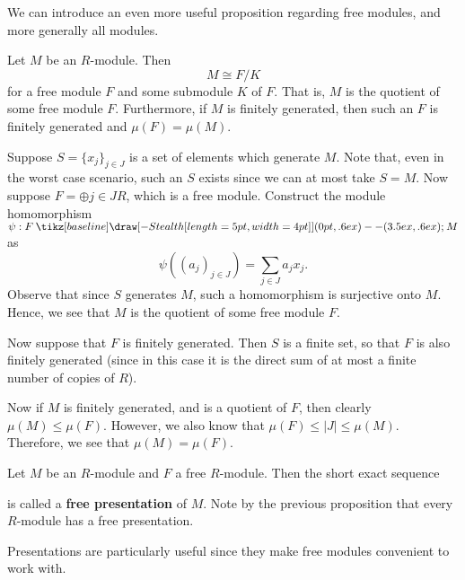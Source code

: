 \documentclass[12pt,letterpaper]{algebra_book}
\renewcommand{\to}{\mathbin{\tikz[baseline] \draw[-{Stealth[length=5pt,width=4pt]}] (0pt,.6ex) -- (3.5ex,.6ex);}}
\theoremstyle{definition}
\begin{document}
We can introduce an even more useful proposition regarding free
modules, and more generally all modules. 

\begin{proposition}
    Let $M$ be an $R$-module. Then 
    \[
        M \cong F/K    
    \]
    for a free module $F$ and some submodule $K$ of $F$. That is,
    $M$ is the quotient of some free module $F$. Furthermore, if
    $M$ is finitely generated, then such an $F$ is finitely
    generated and $\mu(F) = \mu(M)$. 
\end{proposition}

\begin{prf}
    Suppose $S = \{x_j\}_{j \in J}$ is a set of elements which
    generate $M$. Note that, even in the worst case scenario, such
    an $S$ exists since we can at most take $S = M$. Now suppose
    $F = \oplus{j \in J}R$, which is a free module. Construct the
    module homomorphism $\psi: F \to M$ as 
    \[
        \psi((a_j)_{j \in J}) = \sum_{j \in J} a_jx_j.
    \]  
    Observe that since $S$ generates $M$, such a homomorphism is
    surjective onto $M$. Hence, we see that $M$ is the quotient of
    some free module $F$.

    Now suppose that $F$ is finitely generated. Then $S$ is a
    finite set, so that $F$ is also finitely generated (since in
    this case it is the direct sum of at most a finite number of
    copies of $R$). 

    Now if $M$ is finitely generated, and is a quotient of $F$,
    then clearly $\mu(M) \le \mu(F)$. However, we also know that
    $\mu(F) \le |J| \le \mu(M)$. Therefore, we see that $\mu(M) =
    \mu(F)$. 
\end{prf}

\begin{definition}
    Let $M$ be an $R$-module and $F$ a free $R$-module. Then the
    short exact sequence 
    \begin{center}
    \end{center}
    is called a \textbf{free presentation} of $M$. Note by the
    previous proposition that every $R$-module has a free
    presentation. 
\end{definition}

Presentations are particularly useful since they make free modules
convenient to work with. 
\end{document}

